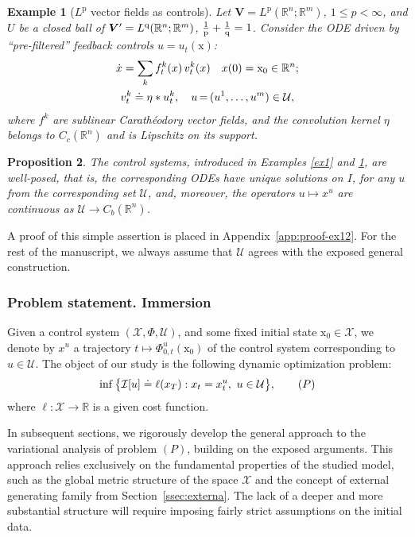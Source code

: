 \documentclass[sn-mathphys-num]{sn-jnl}
\numberwithin{equation}{section}
\theoremstyle{mythm}
\newtheorem{proposition}{Proposition}[section]
\theoremstyle{mydef}
\newtheorem{example}[proposition]{Example}
\newcommand{\R}{\mathbb{R}}
\begin{document}
\begin{example}[$L^{\mathrm{p}}$ vector fields as controls]\label{ex:2}
    Let $\bm V = {L}^{\mathrm{p}}(\R^n; \R^m)$, $1\leq p < \infty$, and $U$ be a closed ball of $\bm V' = {L}^{\rm q}(\R^n; \R^m)$, $\frac{1}{\mathrm p}+\frac{1}{\rm q}=1$. Consider the ODE driven by ``pre-filtered'' feedback controls $u = u_t({\mathrm x})$:
    \begin{gather}
        \dot x = \sum_k f^k_t(x)\,  v^k_t(x)%
        \quad x(0)={\rm x}_0 \in \R^n;\label{ODEex}\\ v^k_t \doteq  \eta * u_t^k, \quad u \, {=}\, 
        (u^1, \ldots, u^m)  \in \mathcal U,\notag
    \end{gather}
    where $f^k$ are sublinear Carath\'{e}odory vector fields, and the convolution kernel $\eta$ belongs to $C_c(\R^n)$ and is Lipschitz on its support.
\end{example}
\begin{proposition}\label{prop:ex12}
    The control systems, introduced in Examples \ref{ex1} and \ref{ex:2}, are well-posed, that is, the corresponding ODEs have unique solutions on $I$, for any $u$ from the corresponding set $\mathcal U$, and, moreover, the operators $u \mapsto x^{u}$ are continuous as $\mathcal U \to C_b(\R^n)$. 
\end{proposition}
A proof of this simple assertion is placed in Appendix~\ref{app:proof-ex12}. For the rest of the manuscript, we always assume that $\mathcal U$ agrees with the exposed general construction.

\subsubsection{Problem statement. Immersion}

 Given a control system $(\mathcal X, \Phi, \mathcal U)$, and some fixed initial state \( \mathrm{x}_0 \in \mathcal{X} \), we denote by $x^{u}$ a trajectory $t \mapsto \Phi^u_{0,t}(\mathrm{x}_0)$ of  the control system corresponding to $u \in \mathcal U$. The object of our study is the following dynamic optimization problem:
\[
    \inf\big\{\mathcal{I}[u] \doteq \ell(x_T) : x_t = x_t^{u}, \ u \in \mathcal{U}\big\}, \tag{${P}$}
\]
where \( \ell \colon \mathcal{X} \to \mathbb{R} \) is a given cost function. 


In subsequent sections, we rigorously develop the general approach to the variational analysis of problem \((P)\), building on the exposed arguments. This approach relies exclusively on the fundamental properties of the studied model, such as the global metric structure of the space \(\mathcal{X}\) and the concept of external generating family from Section~\ref{ssec:externa}. The lack of a deeper and more substantial structure will require imposing fairly strict assumptions on the initial data. 
\end{document}
